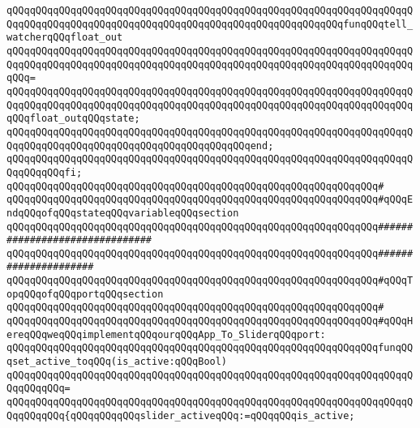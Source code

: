 \verb|qQQqqQQqqQQqqQQqqQQqqQQqqQQqqQQqqQQqqQQqqQQqqQQqqQQqqQQqqQQqqQQqqQQqqQQqqQQqqQQqqQQqqQQqqQQqqQQqqQQqqQQqqQQqqQQqqQQqqQQqqQQqqQQqfunqQQqtell_watcherqQQqfloat_out|\newline
\verb|qQQqqQQqqQQqqQQqqQQqqQQqqQQqqQQqqQQqqQQqqQQqqQQqqQQqqQQqqQQqqQQqqQQqqQQqqQQqqQQqqQQqqQQqqQQqqQQqqQQqqQQqqQQqqQQqqQQqqQQqqQQqqQQqqQQqqQQqqQQqqQQq=|\newline
\verb|qQQqqQQqqQQqqQQqqQQqqQQqqQQqqQQqqQQqqQQqqQQqqQQqqQQqqQQqqQQqqQQqqQQqqQQqqQQqqQQqqQQqqQQqqQQqqQQqqQQqqQQqqQQqqQQqqQQqqQQqqQQqqQQqqQQqqQQqqQQqqQQqfloat_outqQQqstate;|\newline
\verb|qQQqqQQqqQQqqQQqqQQqqQQqqQQqqQQqqQQqqQQqqQQqqQQqqQQqqQQqqQQqqQQqqQQqqQQqqQQqqQQqqQQqqQQqqQQqqQQqqQQqqQQqqQQqqQQqend;|\newline
\verb|qQQqqQQqqQQqqQQqqQQqqQQqqQQqqQQqqQQqqQQqqQQqqQQqqQQqqQQqqQQqqQQqqQQqqQQqqQQqqQQqfi;|\newline
\newline
\verb|qQQqqQQqqQQqqQQqqQQqqQQqqQQqqQQqqQQqqQQqqQQqqQQqqQQqqQQqqQQqqQQq#|\newline
\verb|qQQqqQQqqQQqqQQqqQQqqQQqqQQqqQQqqQQqqQQqqQQqqQQqqQQqqQQqqQQqqQQq#qQQqEndqQQqofqQQqstateqQQqvariableqQQqsection|\newline
\verb|qQQqqQQqqQQqqQQqqQQqqQQqqQQqqQQqqQQqqQQqqQQqqQQqqQQqqQQqqQQqqQQq###############################|\newline
\newline
\newline
\verb|qQQqqQQqqQQqqQQqqQQqqQQqqQQqqQQqqQQqqQQqqQQqqQQqqQQqqQQqqQQqqQQq#####################|\newline
\verb|qQQqqQQqqQQqqQQqqQQqqQQqqQQqqQQqqQQqqQQqqQQqqQQqqQQqqQQqqQQqqQQq#qQQqTopqQQqofqQQqportqQQqsection|\newline
\verb|qQQqqQQqqQQqqQQqqQQqqQQqqQQqqQQqqQQqqQQqqQQqqQQqqQQqqQQqqQQqqQQq#|\newline
\verb|qQQqqQQqqQQqqQQqqQQqqQQqqQQqqQQqqQQqqQQqqQQqqQQqqQQqqQQqqQQqqQQq#qQQqHereqQQqweqQQqimplementqQQqourqQQqApp_To_SliderqQQqport:|\newline
\newline
\verb|qQQqqQQqqQQqqQQqqQQqqQQqqQQqqQQqqQQqqQQqqQQqqQQqqQQqqQQqqQQqqQQqfunqQQqset_active_toqQQq(is_active:qQQqBool)|\newline
\verb|qQQqqQQqqQQqqQQqqQQqqQQqqQQqqQQqqQQqqQQqqQQqqQQqqQQqqQQqqQQqqQQqqQQqqQQqqQQqqQQq=|\newline
\verb|qQQqqQQqqQQqqQQqqQQqqQQqqQQqqQQqqQQqqQQqqQQqqQQqqQQqqQQqqQQqqQQqqQQqqQQqqQQqqQQq{qQQqqQQqqQQqslider_activeqQQq:=qQQqqQQqis_active;|\newline

